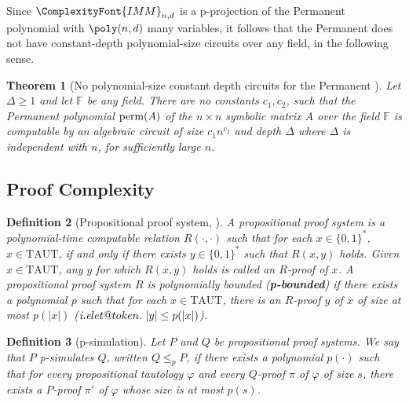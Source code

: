 \documentclass[11pt,letter]{article}
\makeatletter
\newtheorem{theorem}{Theorem}[section]
\newtheorem{definition}[theorem]{Definition}
\theoremstyle{remark} %
\DeclareRobustCommand\onedot{\futurelet\@let@token\@onedot}
\def\@onedot{\ifx\@let@token.\else.\null\fi\xspace}
\def\ie{\emph{i.e}\onedot} \def\Ie{\emph{I.e}\onedot}
\newcommand{\perm}{{\rm perm}}
\newcommand{\IMM}{\ComplexityFont{IMM}}
\makeatother
\begin{document}
{    
    Since $\IMM_{n,d}$ is a p-projection of the Permanent polynomial with $\poly(n,d)$ many variables, it follows that the Permanent does not have constant-depth polynomial-size circuits over any field, in the following sense.
    
    \begin{theorem}[No polynomial-size constant depth circuits for the Permanent \cite{LST25,forbes2024low}]
        \label{theorem: LST25}
        Let $\Delta \geq 1$ and let $\mathbb{F}$ be any field.  
        There are no constants $c_1,c_2$, such that the Permanent polynomial $\perm(A)$ of the $n \times n$ symbolic matrix $A$ over the field $\mathbb{F}$ is computable by an algebraic circuit of size $c_1 n^{c_2}$ and depth $\Delta$ where $\Delta$ is independent with $n$, for sufficiently large $n$. 
    \end{theorem}

    \subsection{Proof Complexity}

    \begin{definition}[Propositional proof system, \cite{CR79}] 
        \label{def: propositional proof system}
        A propositional proof system is a polynomial-time computable relation $R(\cdot, \cdot)$ such that for each $x \in \{0,1\}^\ast$, $x\in \mathrm{TAUT}$, if and only if there exists $y\in \{0,1\}^\ast$ such that $R(x,y)$ holds. Given $x\in \mathrm{TAUT}$, any $y$ for which $R(x,y)$ holds is called an $R$-proof of $x$. A propositional proof system $R$ is polynomially bounded (\textbf{p-bounded}) if there exists a polynomial $p$ such that for each $x \in \mathrm{TAUT}$, there is an $R$-proof $y$ of $x$ of size at most $p(|x|)$ ($\ie \ |y| \leq p(|x|)$).
    \end{definition}

    \begin{definition}[p-simulation]
        \label{def: p-simulation}
        Let $P$ and $Q$ be propositional proof systems. We say that \emph{$P$ p-simulates $Q$}, written $Q \leq_p P$, if there exists a polynomial $p(\cdot)$ such that for every propositional tautology $\varphi$ and every $Q$-proof $\pi$ of $\varphi$ of size $s$, there exists a $P$-proof $\pi'$ of $\varphi$ whose size is at most $p(s)$.
    \end{definition}

}
\end{document}
